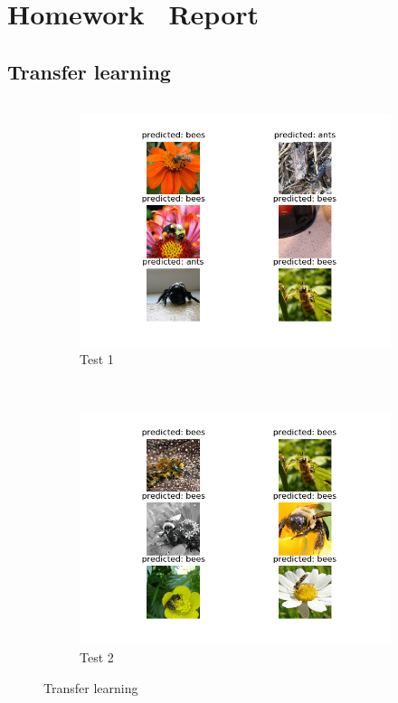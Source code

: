 \documentclass[12pt]{article}
\begin{document}
\section{Homework \thesection\ Report}
\subsection{Transfer learning}
\begin{tiny}
\inputminted[frame=single,framesep=10pt,linenos, breaklines,xleftmargin=\parindent,xrightmargin=\parindent]{python}{./Homework2/code/transfer_learning.py}
\end{tiny}
\newpage
\begin{figure}[htbp]
    \centering
    \begin{subfigure}[t]{0.48\textwidth}
        \centering
        \includegraphics[trim={3in 0in 3in 0in},scale=0.8]{./Homework2/output/hw2p1_fig01.png}
        \caption{Test 1}
    \label{hw2p1a}
    \end{subfigure}\\
    \begin{subfigure}[t]{0.48\textwidth}
        \centering
        \includegraphics[trim={3in 0in 3in 0in},scale=0.8]{./Homework2/output/hw2p1_fig02.png}
        \caption{Test 2}
    \label{hw2p1b}
    \end{subfigure}
    \caption{Transfer learning}
\end{figure}
\end{document}
